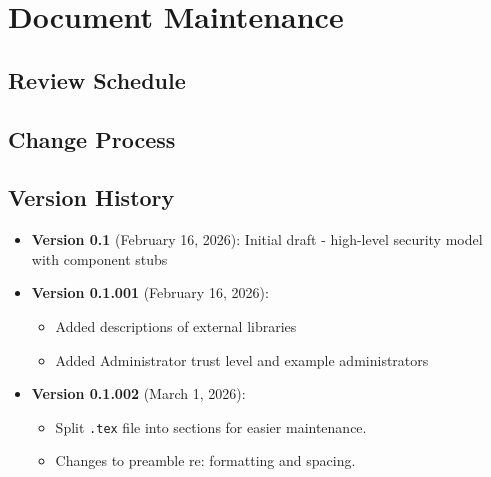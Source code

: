 \documentclass[../veristore_security_model.tex]{subfiles}
\begin{document}
\section{Document Maintenance}


\subsection{Review Schedule}


\subsection{Change Process}


\subsection{Version History}

\begin{itemize}
    \item \textbf{Version 0.1} (February 16, 2026): Initial draft - high-level security model with component stubs
    \item \textbf{Version 0.1.001} (February 16, 2026):
    \begin{itemize}
        \item Added descriptions of external libraries
        \item Added Administrator trust level and example administrators
    \end{itemize}
    \item \textbf{Version 0.1.002} (March 1, 2026):
    \begin{itemize}
        \item Split \texttt{.tex} file into sections for easier maintenance.
        \item Changes to preamble re: formatting and spacing.
    \end{itemize}
\end{itemize}
\end{document}
